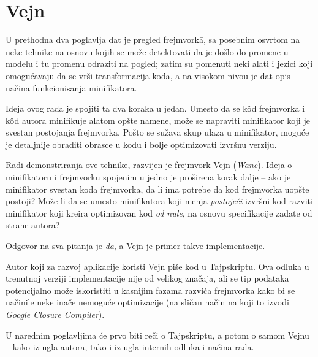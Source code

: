 \section{Vejn}

U prethodna dva poglavlja dat je pregled frejmvork\=a, sa posebnim osvrtom na neke tehnike na osnovu kojih se može detektovati da je došlo do promene u modelu i tu promenu odraziti na pogled; zatim su pomenuti neki alati i jezici koji omogućavaju da se vrši transformacija koda, a na visokom nivou je dat opis načina funkcionisanja minifikatora.

Ideja ovog rada je spojiti ta dva koraka u jedan.
Umesto da se kôd frejmvorka i kôd autora minifikuje alatom opšte namene, može se napraviti minifikator koji je svestan postojanja frejmvorka.
Pošto se sužava skup ulaza u minifikator, moguće je detaljnije obraditi obrasce u kodu i bolje optimizovati izvršnu verziju.

Radi demonstriranja ove tehnike, razvijen je frejmvork Vejn (\textsl{Wane}).
Ideja o minifikatoru i frejmvorku spojenim u jedno je proširena korak dalje -- ako je minifikator svestan koda frejmvorka, da li ima potrebe da kod frejmvorka uopšte postoji?
Može li da se umesto minifikatora koji menja \emph{postojeći} izvršni kod razviti minifikator koji kreira optimizovan kod \emph{od nule}, na osnovu specifikacije zadate od strane autora?

Odgovor na sva pitanja je \emph{da}, a Vejn je primer takve implementacije.

Autor koji za razvoj aplikacije koristi Vejn piše kod u Tajpskriptu.
Ova odluka u trenutnoj verziji implementacije nije od velikog značaja, ali se tip podataka potencijalno može iskoristiti u kasnijim fazama razvića frejmvorka kako bi se načinile neke inače nemoguće optimizacije (na sličan način na koji to izvodi \textsl{Google Closure Compiler}).

U narednim poglavljima će prvo biti reči o Tajpskriptu, a potom o samom Vejnu -- kako iz ugla autora, tako i iz ugla internih odluka i načina rada.
